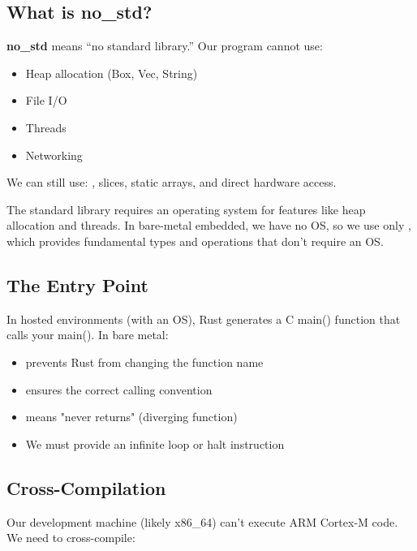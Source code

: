 \subsection{What is no\_std?}

\begin{notebox}
    \textbf{no\_std} means ``no standard library.'' Our program cannot use:
    \begin{itemize}
        \item Heap allocation (Box, Vec, String)
        \item File I/O
        \item Threads
        \item Networking
    \end{itemize}

    We can still use: , slices, static arrays, and direct hardware access.
\end{notebox}

The standard library requires an operating system for features like heap allocation and threads. In bare-metal embedded, we have no OS, so we use only , which provides fundamental types and operations that don't require an OS.

\subsection{The Entry Point}

In hosted environments (with an OS), Rust generates a C main() function that calls your main(). In bare metal:

\begin{itemize}
    \item \codeinline{#[no_mangle]} prevents Rust from changing the function name
    \item {} ensures the correct calling convention
    \item \codeinline{-> !} means "never returns" (diverging function)
    \item We must provide an infinite loop or halt instruction
\end{itemize}

\subsection{Cross-Compilation}

Our development machine (likely x86\_64) can't execute ARM Cortex-M code. We need to cross-compile:

